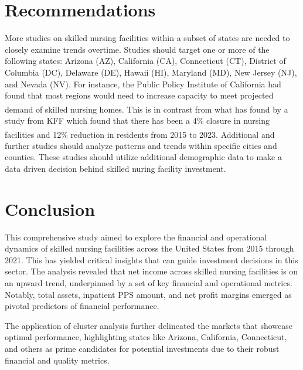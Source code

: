 \documentclass{article}
\theoremstyle{mytheoremstyle}
\theoremstyle{mytheoremstyle}
\theoremstyle{myproblemstyle}
\begin{document}
\pagebreak
\section{Recommendations}

More studies on skilled nursing facilities within a subset of states are needed to closely examine trends overtime. Studies should target one or more of the following states: Arizona (AZ), California (CA), Connecticut (CT), District of Columbia (DC), Delaware (DE), Hawaii (HI), Maryland (MD), New Jersey (NJ), and Nevada (NV). For instance, the Public Policy Institute of California had found that most regions would need to increase capacity to meet projected demand of skilled nursing homes\textsuperscript{\cite{ppic2024}}. This is in contrast from what has found by a study from KFF which found that there has been a 4\% closure in nursing facilities and 12\% reduction in residents from 2015 to 2023\textsuperscript{\cite{kff2024}}. Additional and further studies should analyze patterns and trends within specific cities and counties. These studies should utilize additional demographic data to make a data driven decision behind skilled nuring facility investment. 


\pagebreak
\section{Conclusion}
This comprehensive study aimed to explore the financial and operational dynamics of skilled nursing facilities across the United States from 2015 through 2021. This has yielded critical insights that can guide investment decisions in this sector. The analysis revealed that net income across skilled nursing facilities is on an upward trend, underpinned by a set of key financial and operational metrics. Notably, total assets, inpatient PPS amount, and net profit margins emerged as pivotal predictors of financial performance.

The application of cluster analysis further delineated the markets that showcase optimal performance, highlighting states like Arizona, California, Connecticut, and others as prime candidates for potential investments due to their robust financial and quality metrics. 
\end{document}

